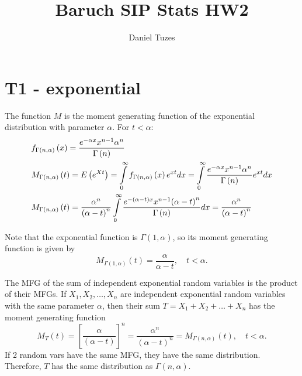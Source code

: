 \documentclass{article}
\title{Baruch SIP Stats HW2}
\author{Daniel Tuzes}
\begin{document}
\maketitle
\tableofcontents

\section{T1 - exponential}
The function $M$ is the moment generating function of the exponential distribution with parameter $\alpha$. For $t < \alpha$:
\[\begin{gathered}
        {f_{\Gamma \left( {n,\alpha } \right)}}\left( x \right) = \frac{{{e^{ - \alpha x}}{x^{n - 1}}{\alpha ^n}}}{{\Gamma \left( n \right)}} \hfill \\
        {M _{\Gamma \left( {n,\alpha } \right)}}\left( t \right) = E\left( {{e^{Xt}}} \right) = \int\limits_0^\infty  {{f_{\Gamma \left( {n,\alpha } \right)}}\left( x \right){e^{xt}}dx}  = \int\limits_0^\infty  {\frac{{{e^{ - \alpha x}}{x^{n - 1}}{\alpha ^n}}}{{\Gamma \left( n \right)}}{e^{xt}}dx}  \hfill \\
        {M _{\Gamma \left( {n,\alpha } \right)}}\left( t \right) = \frac{{{\alpha ^n}}}{{{{\left( {\alpha  - t} \right)}^n}}}\int\limits_0^\infty  {\frac{{{e^{ - \left( {\alpha  - t} \right)x}}{x^{n - 1}}{{\left( {\alpha  - t} \right)}^n}}}{{\Gamma \left( n \right)}}dx}  = \frac{{{\alpha ^n}}}{{{{\left( {\alpha  - t} \right)}^n}}} \hfill \\
    \end{gathered} \]

Note that the exponential function is $\Gamma(1,\alpha)$, so its moment generating function is given by
\[
    M_{\Gamma(1,\alpha)}(t) = \frac{\alpha}{\alpha - t}, \quad t < \alpha.
\]

The MFG of the sum of independent exponential random variables is the product of their MFGs.
If \(X_1, X_2, \ldots, X_n\) are independent exponential random variables with the same parameter \(\alpha\), then their sum \(T = X_1 + X_2 + \ldots + X_n\) has the moment generating function
\[
    M_T(t) = \left[\frac{\alpha}{(\alpha - t)}\right]^n = \frac{\alpha^n}{(\alpha - t)^n}= M_{\Gamma(n,\alpha)}(t) , \quad t < \alpha.
\]
If 2 random vars have the same MFG, they have the same distribution. Therefore, \(T\) has the same distribution as \(\Gamma(n,\alpha)\).
\end{document}
